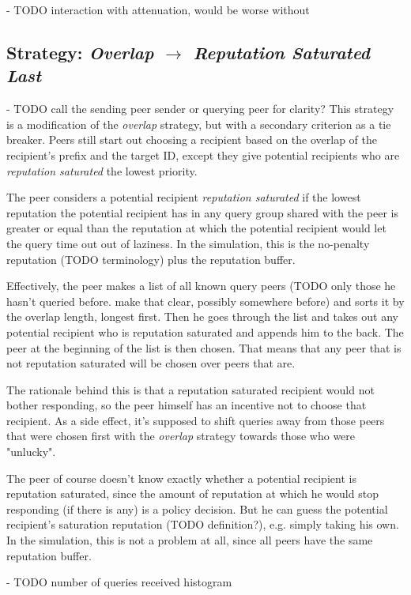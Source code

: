 - TODO interaction with attenuation, would be worse without

\subsection{Strategy: \emph{Overlap $\rightarrow$ Reputation Saturated Last}}
- TODO call the sending peer sender or querying peer for clarity?
This strategy is a modification of the \emph{overlap} strategy, but with a
secondary criterion as a tie breaker. Peers still start out choosing a recipient
based on the overlap of the recipient's prefix and the target ID, except they
give potential recipients who are \emph{reputation saturated} the lowest
priority.

The peer considers a potential recipient \emph{reputation saturated} if the
lowest reputation the potential recipient has in any query group shared with the
peer is greater or equal than the reputation at which the potential recipient
would let the query time out out of laziness. In the simulation, this is the
no-penalty reputation (TODO terminology) plus the reputation buffer.

Effectively, the peer makes a list of all known query peers (TODO only those he
hasn't queried before. make that clear, possibly somewhere before) and sorts it
by the overlap length, longest first. Then he goes through the list and takes
out any potential recipient who is reputation saturated and appends him to the
back. The peer at the beginning of the list is then chosen. That means that any
peer that is not reputation saturated will be chosen over peers that are.

The rationale behind this is that a reputation saturated recipient would not
bother responding, so the peer himself has an incentive not to choose that
recipient. As a side effect, it's supposed to shift queries away from those
peers that were chosen first with the \emph{overlap} strategy towards those who
were "unlucky".

The peer of course doesn't know exactly whether a potential recipient is
reputation saturated, since the amount of reputation at which he would stop
responding (if there is any) is a policy decision. But he can guess the
potential recipient's saturation reputation (TODO definition?), e.g. simply
taking his own. In the simulation, this is not a problem at all, since all peers
have the same reputation buffer.

- TODO number of queries received histogram

